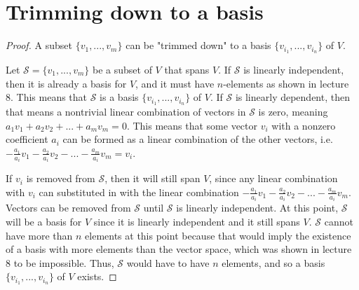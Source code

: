 \section{Trimming down to a basis}
\begin{proof} A subset $\{v_1,...,v_m\}$ can be "trimmed down" to a basis $\{v_{i_1},...,v_{i_n}\}$ of $V$.\gap

    Let $\mathcal{S} = \{v_1,...,v_m\}$ be a subset of $V$ that spans $V$. 
    If $\mathcal{S}$ is linearly independent, then it is already a basis for $V$,
    and it must have $n$-elements as shown in lecture 8.
    This means that $\mathcal{S}$ is a basis $\{v_{i_1},...,v_{i_n}\}$ of $V$.
    If $\mathcal{S}$ is linearly dependent,
    then that means a nontrivial linear combination 
    of vectors in $\mathcal{S}$ is zero, meaning
    $a_1v_1 + a_2v_2 + ... + a_mv_m = 0$.
    This means that some vector $v_i$ with a nonzero coefficient $a_i$
    can be formed as a linear combination of the other vectors, i.e.
    $-\frac{a_1}{a_i}v_1 - \frac{a_2}{a_i}v_2 - ... - \frac{a_m}{a_i}v_m = v_i$.\gap

    If $v_i$ is removed from $\mathcal{S}$, then it will still span $V$,
    since any linear combination with $v_i$ can substituted in with the linear combination
    $-\frac{a_1}{a_i}v_1 - \frac{a_2}{a_i}v_2 - ... - \frac{a_m}{a_i}v_m$.
    Vectors can be removed from $\mathcal{S}$ until 
    $\mathcal{S}$ is linearly independent.
    At this point, $\mathcal{S}$ will be a basis for $V$ since
    it is linearly independent and it still spans $V$.
    $\mathcal{S}$ cannot have more than $n$ elements at this point 
    because that would imply the existence of a basis 
    with more elements than the vector space, 
    which was shown in lecture 8 to be impossible.
    Thus, $\mathcal{S}$ would have to have $n$ elements, and so
    a basis $\{v_{i_1},...,v_{i_n}\}$ of $V$ exists.
\end{proof}